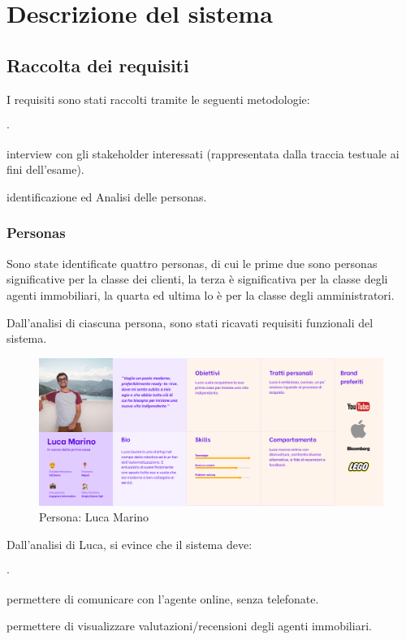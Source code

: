 \chapter{Descrizione del sistema}
\section{Raccolta dei requisiti}
I requisiti sono stati raccolti tramite le seguenti metodologie:
\begin{list}{$\cdot$}{}
    \item interview con gli stakeholder interessati (rappresentata dalla traccia testuale ai fini dell’esame).
    \item identificazione ed Analisi delle personas.
\end{list}

\subsection{Personas}
Sono state identificate quattro personas, di cui le prime due sono personas
significative per la classe dei clienti, la terza è significativa per
la classe degli agenti immobiliari, la quarta ed ultima lo è
per la classe degli amministratori.

\noindent
Dall'analisi di ciascuna persona, sono stati ricavati requisiti funzionali del sistema.

\begin{figure}[h]
    \centering
    \includegraphics[width=\textwidth]{assets/personas/luca-marino.png}
    \caption{Persona: Luca Marino}
    \label{fig:luca-marino}
\end{figure}

\noindent
Dall'analisi di Luca, si evince che il sistema deve:
\begin{list}{$\cdot$}{}
    \item permettere di comunicare con l’agente online, senza telefonate.
    \item permettere di visualizzare valutazioni/recensioni degli agenti immobiliari.
\end{list}

